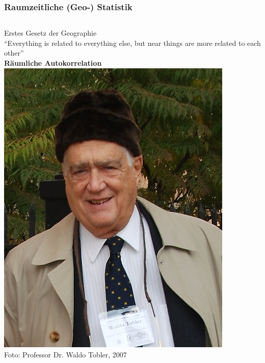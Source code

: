 \documentclass{beamer}
\begin{document}
\begin{frame}
\frametitle{Raumzeitliche (Geo-) Statistik}
\begin{columns}
\alert{Erstes Gesetz der Geographie}\\[0.5cm]
``Everything is related to everything else, but near things are more related to each other''\\[0.5cm]
\textbf{Räumliche Autokorrelation}\\
\hspace{2cm}
\raggedleft
\includegraphics[width=0.85\textwidth]{Figures/Tobler_2007.png}\\
\tiny Foto: Professor Dr. Waldo Tobler, 2007
\end{columns}
\end{frame}

\end{document}
